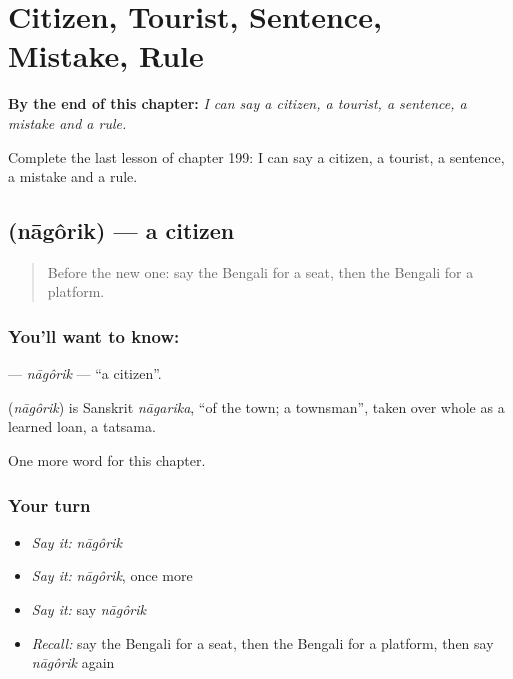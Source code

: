
\chapter{Citizen, Tourist, Sentence, Mistake, Rule}
\label{ch:bn-citizen-tourist-sentence-mistake-rule}

\begin{chapteropening}
\textbf{By the end of this chapter:} \emph{I can say a citizen, a tourist, a sentence, a mistake and a rule.}

Complete the last lesson of chapter 199: I can say a citizen, a tourist, a sentence, a mistake and a rule.
\end{chapteropening}

\section[\texorpdfstring{\bn{নাগরিক} (nāgôrik)}{নাগরিক (nāgôrik)}]{ (nāgôrik) — a citizen}

\label{lesson:BN-C199-nagorik}



\begin{quote}
Before the new one: say the Bengali for a seat, then the Bengali for a platform.
\end{quote}

\subsection*{You'll want to know: }
\textbf{} — \emph{nāgôrik} — \textquotedblleft{}a citizen\textquotedblright{}.

\begin{cousinweb}
\textbf{} (\emph{nāgôrik}) is Sanskrit \emph{nāgarika}, \textquotedblleft{}of the town; a townsman\textquotedblright{}, taken over whole as a learned loan, a tatsama.
\end{cousinweb}

\begin{grammarlens}[title={What you've built}]
One more word for this chapter.
\end{grammarlens}

\subsection*{Your turn}
\begin{itemize}
\raggedright
  \item \emph{Say it:} \emph{nāgôrik}
  \item \emph{Say it:} \emph{nāgôrik}, once more
  \item \emph{Say it:} say \emph{nāgôrik}
  \item \emph{Recall:} say the Bengali for a seat, then the Bengali for a platform, then say \emph{nāgôrik} again
\end{itemize}

